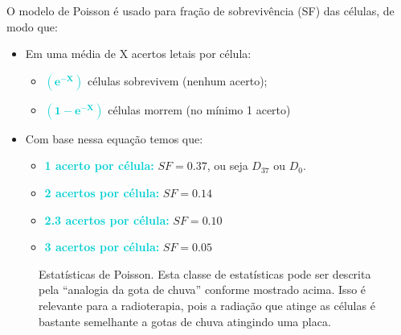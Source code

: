 \documentclass[11pt,a4paper]{article}
\begin{document}
	O modelo de Poisson é usado para fração de sobrevivência (SF) das células, de modo que:

	\begin{itemize}
		\item Em uma média de X acertos letais por célula:
		\begin{itemize}[label=\textcolor{CarnationPink}{$\star$}]
			\item \textcolor{DarkTurquoise}{\textbf{$\mathbf{\left(e^{-X}\right)}$}} células sobrevivem (nenhum acerto);
			\item \textcolor{DarkTurquoise}{\textbf{$\mathbf{\left(1 - e^{-X}\right)}$}} células morrem (no mínimo 1 acerto)
		\end{itemize}

		\item Com base nessa equação temos que:
		\begin{itemize}[label=\textcolor{CarnationPink}{$\star$}]
			\item \textcolor{DarkTurquoise}{\textbf{1 acerto por célula:}} $SF = 0.37$, ou seja $D_{37}$ ou $D_0$.
			\item \textcolor{DarkTurquoise}{\textbf{2 acertos por célula:}} $SF = 0.14$
			\item \textcolor{DarkTurquoise}{\textbf{2.3 acertos por célula:}} $SF = 0.10$
			\item \textcolor{DarkTurquoise}{\textbf{3 acertos por célula:}} $SF = 0.05$
		\end{itemize}
	\end{itemize}

	\begin{figure}[h]
		\centering
		\caption{Estatísticas de Poisson. Esta classe de estatísticas pode ser descrita pela “analogia da gota de chuva” conforme mostrado acima. Isso é relevante para a radioterapia, pois a radiação que atinge as células é bastante semelhante a gotas de chuva atingindo uma placa.}
		\label{fig:estatisticaDePoison}
	\end{figure}
\end{document}
